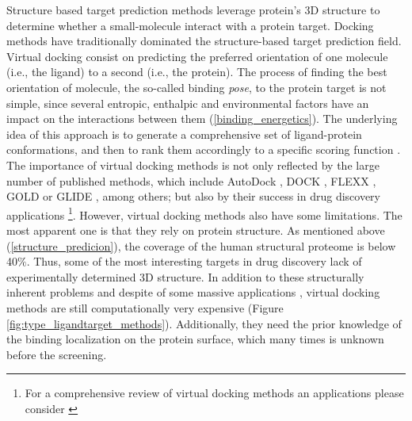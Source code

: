 \documentclass[11pt, b5paper,twoside]{tesi_upf}
\begin{document}
\par Structure based target prediction methods leverage protein's 3D structure to determine whether a small-molecule interact with a protein target. Docking methods have traditionally dominated the structure-based target prediction field. Virtual docking consist on predicting the preferred orientation of one molecule (i.e., the ligand) to a second (i.e., the protein). The process of finding the best orientation of molecule, the so-called binding \textit{pose}, to the protein target is not simple, since several entropic, enthalpic and environmental factors have an impact on the interactions between them (\cref{binding_energetics}). The underlying idea of this approach is to generate a comprehensive set of ligand-protein conformations, and then to rank them accordingly to a specific scoring function \cite{Alonso2006}. The importance of virtual docking methods is not only reflected by the large number of published methods, which include AutoDock \cite{Morris2009, Trott2010}, DOCK \cite{Ewing1997}, FLEXX \cite{Rarey1996}, GOLD \cite{Jones1997} or GLIDE \cite{Friesner2004}, among others; but also by their success in drug discovery applications \cite{Schames2004, Enyedy2001, Vangrevelinghe2003} \footnote{For a comprehensive review of virtual docking methods an applications please consider \cite{Kitchen2004}}. However, virtual docking methods also have some limitations. The most apparent one is that they rely on protein structure. As mentioned above (\cref{structure_predicion}), the coverage of the human structural proteome is below 40$\%$. Thus, some of the most interesting targets in drug discovery lack of experimentally determined 3D structure. In addition to these structurally inherent problems and despite of some massive applications \cite{Reardon2013}, virtual docking methods are still computationally very expensive (Figure \ref{fig:type_ligandtarget_methods}). Additionally, they need the prior knowledge of the binding localization on the protein surface, which many times is unknown before the screening. 
\end{document}
